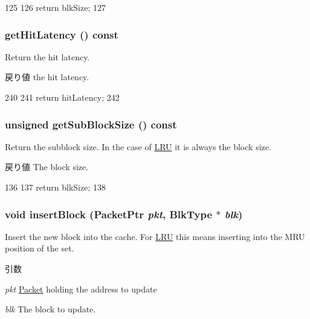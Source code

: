 \begin{DoxyCode}
125     {
126         return blkSize;
127     }
\end{DoxyCode}
\hypertarget{classLRU_a0239f3ef0ba6cf7c0460b12d289e6517}{
\subsubsection[{getHitLatency}]{ getHitLatency () const}}
\label{classLRU_a0239f3ef0ba6cf7c0460b12d289e6517}
Return the hit latency. \begin{DoxyReturn}{戻り値}
the hit latency. 
\end{DoxyReturn}



\begin{DoxyCode}
240     {
241         return hitLatency;
242     }
\end{DoxyCode}
\hypertarget{classLRU_aca3769c95ef908ce22475a69f8929a32}{
\subsubsection[{getSubBlockSize}]{\setlength{\rightskip}{0pt plus 5cm}unsigned getSubBlockSize () const}}
\label{classLRU_aca3769c95ef908ce22475a69f8929a32}
Return the subblock size. In the case of \hyperlink{classLRU}{LRU} it is always the block size. \begin{DoxyReturn}{戻り値}
The block size. 
\end{DoxyReturn}



\begin{DoxyCode}
136     {
137         return blkSize;
138     }
\end{DoxyCode}
\hypertarget{classLRU_a79eef32acfa26685ba4a2f8e89f3f949}{
\subsubsection[{insertBlock}]{\setlength{\rightskip}{0pt plus 5cm}void insertBlock ({\bf PacketPtr} {\em pkt}, \/  {\bf BlkType} $\ast$ {\em blk})}}
\label{classLRU_a79eef32acfa26685ba4a2f8e89f3f949}
Insert the new block into the cache. For \hyperlink{classLRU}{LRU} this means inserting into the MRU position of the set. 
\begin{DoxyParams}{引数}
\item[{\em pkt}]\hyperlink{classPacket}{Packet} holding the address to update \item[{\em blk}]The block to update. \end{DoxyParams}



